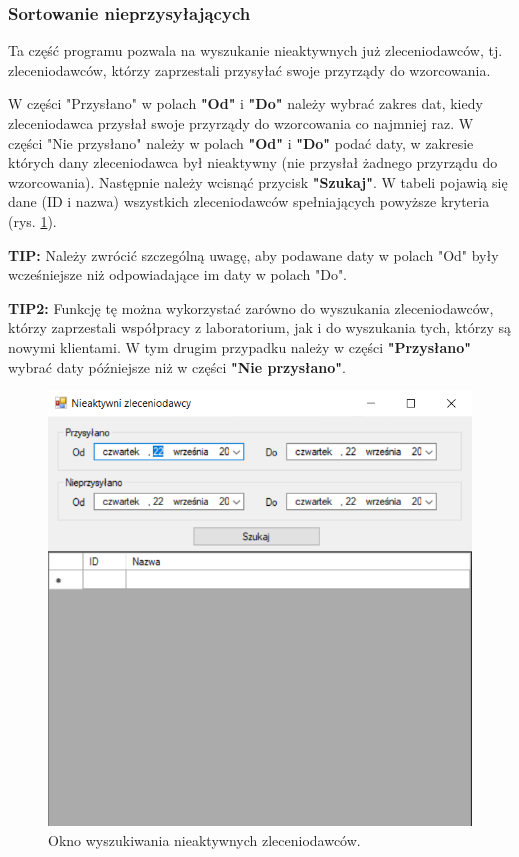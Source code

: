 \subsubsection{Sortowanie nieprzysyłających}
\label{sort_nieprzysylajacych}

Ta część programu pozwala na wyszukanie nieaktywnych już zleceniodawców, tj. zleceniodawców, którzy zaprzestali przysyłać swoje przyrządy do wzorcowania.

W części "Przysłano" w polach \textbf{"Od"} i \textbf{"Do"} należy wybrać zakres dat, kiedy zleceniodawca przysłał swoje przyrządy do wzorcowania co najmniej raz. W części "Nie przysłano" należy w polach \textbf{"Od"} i \textbf{"Do"} podać daty, w zakresie których dany zleceniodawca był nieaktywny (nie przysłał żadnego przyrządu do wzorcowania). Następnie należy wcisnąć przycisk \textbf{"Szukaj"}. W tabeli pojawią się dane (ID i nazwa) wszystkich zleceniodawców spełniających powyższe kryteria (rys. \ref{nieaktywniZleceniodawcy}).

\textbf{TIP:} Należy zwrócić szczególną uwagę, aby podawane daty w polach "Od" były wcześniejsze niż odpowiadające im daty w polach "Do".

\textbf{TIP2:} Funkcję tę można wykorzystać zarówno do wyszukania zleceniodawców, którzy zaprzestali współpracy z laboratorium, jak i do wyszukania tych, którzy są nowymi klientami. W tym drugim przypadku należy w części \textbf{"Przysłano"} wybrać daty późniejsze niż w części \textbf{"Nie przysłano"}.

\begin{figure}[htb]
	\centering
	\includegraphics{obrazki/Wyszukiwanie/Zleceniodawcy/nieaktywni_zleceniodawcy.png}
	\caption{Okno wyszukiwania nieaktywnych zleceniodawców.}
	\label{nieaktywniZleceniodawcy}
\end{figure}

